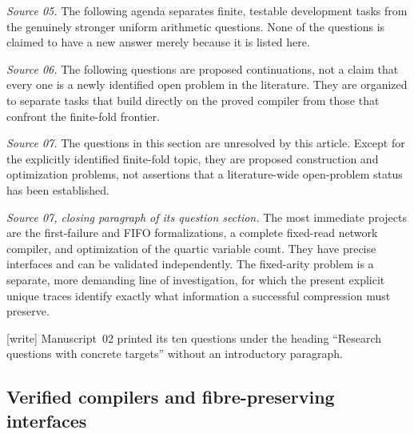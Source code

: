 \documentclass[11pt,a4paper]{article}
\theoremstyle{definition}
\theoremstyle{remark}
\newcommand{\wtag}{\textup{[write]}}%
\begin{document}
\emph{Source 05.} The following agenda separates finite, testable
development tasks from the genuinely stronger uniform arithmetic
questions. None of the questions is claimed to have a new answer merely
because it is listed here.

\emph{Source 06.} The following questions are proposed continuations,
not a claim that every one is a newly identified open problem in the
literature. They are organized to separate tasks that build directly on
the proved compiler from those that confront the finite-fold frontier.

\emph{Source 07.} The questions in this section are unresolved by this
article. Except for the explicitly identified finite-fold topic, they are
proposed construction and optimization problems, not assertions that a
literature-wide open-problem status has been established.

\emph{Source 07, closing paragraph of its question section.} The most
immediate projects are the first-failure and FIFO formalizations, a
complete fixed-read network compiler, and optimization of the quartic
variable count. They have precise interfaces and can be validated
independently. The fixed-arity problem is a separate, more demanding line
of investigation, for which the present explicit unique traces identify
exactly what information a successful compression must preserve.

\wtag{} Manuscript~02 printed its ten questions under the heading
``Research questions with concrete targets'' without an introductory
paragraph.

\subsection{Verified compilers and fibre-preserving interfaces}
\end{document}
